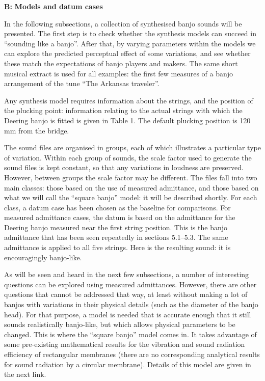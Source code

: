   \textbf{B: }\textbf{Models and datum cases} 

  In the following subsections, a collection of synthesised banjo sounds will 
  be presented. The first step is to check whether the synthesis models can 
  succeed in ``sounding like a banjo''. After that, by varying parameters 
  within the models we can explore the predicted perceptual effect of some 
  variations, and see whether these match the expectations of banjo players and 
  makers. The same short musical extract is used for all examples: the first 
  few measures of a banjo arrangement of the tune ``The Arkansas traveler''. 

  Any synthesis model requires information about the strings, and the position 
  of the plucking point: information relating to the actual strings with which 
  the Deering banjo is fitted is given in Table 1. The default plucking 
  position is 120 mm from the bridge. 

  The sound files are organised in groups, each of which illustrates a 
  particular type of variation. Within each group of sounds, the scale factor 
  used to generate the sound files is kept constant, so that any variations in 
  loudness are preserved. However, between groups the scale factor may be 
  different. The files fall into two main classes: those based on the use of 
  measured admittance, and those based on what we will call the ``square 
  banjo'' model: it will be described shortly. For each class, a datum case has 
  been chosen as the baseline for comparisons. For measured admittance cases, 
  the datum is based on the admittance for the Deering banjo measured near the 
  first string position. This is the banjo admittance that has been seen 
  repeatedly in sections 5.1--5.3. The same admittance is applied to all five 
  strings. Here is the resulting sound: it is encouragingly banjo-like. 

  As will be seen and heard in the next few subsections, a number of 
  interesting questions can be explored using measured admittances. However, 
  there are other questions that cannot be addressed that way, at least without 
  making a lot of banjos with variations in their physical details (such as the 
  diameter of the banjo head). For that purpose, a model is needed that is 
  accurate enough that it still sounds realistically banjo-like, but which 
  allows physical parameters to be changed. This is where the ``square banjo'' 
  model comes in. It takes advantage of some pre-existing mathematical results 
  for the vibration and sound radiation efficiency of rectangular membranes 
  (there are no corresponding analytical results for sound radiation by a 
  circular membrane). Details of this model are given in the next link. 

